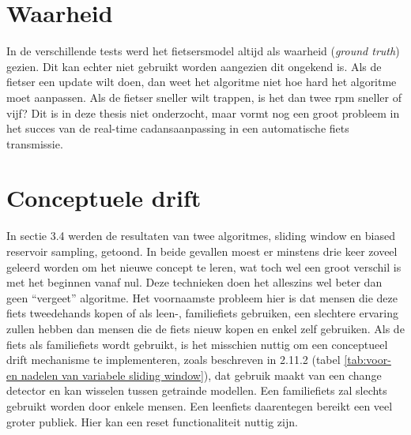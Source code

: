 \section{Waarheid}
In de verschillende tests werd het fietsersmodel altijd als waarheid (\textit{ground truth}) gezien. Dit kan echter niet gebruikt worden aangezien dit ongekend is. Als de fietser een update wilt doen, dan weet het algoritme niet hoe hard het algoritme moet aanpassen. Als de fietser sneller wilt trappen, is het dan twee rpm sneller of vijf? Dit is in deze thesis niet onderzocht, maar vormt nog een groot probleem in het succes van de real-time cadansaanpassing in een automatische fiets transmissie.
\section{Conceptuele drift}
In sectie 3.4 werden de resultaten van twee algoritmes, sliding window en biased reservoir sampling, getoond. In beide gevallen moest er minstens drie keer zoveel geleerd worden om het nieuwe concept te leren, wat toch wel een groot verschil is met het beginnen vanaf nul. Deze technieken doen het alleszins wel beter dan geen “vergeet” algoritme. Het voornaamste probleem hier is dat mensen die deze fiets tweedehands kopen of als leen-, familiefiets gebruiken, een slechtere ervaring zullen hebben dan mensen die de fiets nieuw kopen en enkel zelf gebruiken. Als de fiets als familiefiets wordt gebruikt, is het misschien nuttig om een conceptueel drift mechanisme te implementeren, zoals beschreven in 2.11.2 (tabel \ref{tab:voor- en nadelen van variabele sliding window}), dat gebruik maakt van een change detector en kan wisselen tussen getrainde modellen. Een familiefiets zal slechts gebruikt worden door enkele mensen. Een leenfiets daarentegen bereikt een veel groter publiek. Hier kan een reset functionaliteit nuttig zijn.
